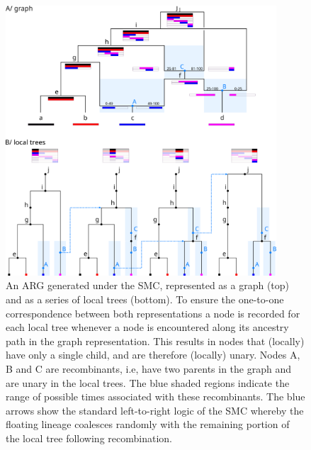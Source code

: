 \documentclass{article}
\begin{document}
\begin{figure}
\centering
\includegraphics[width=0.9\textwidth]{figures/smc_custom_2rows_area_full_hap.png}
\caption{An ARG generated under the SMC, represented as a graph (top) and as a
series of local trees (bottom). To ensure the one-to-one correspondence
between both representations a node is recorded for each local tree whenever
a node is encountered along its ancestry path in the graph representation.
This results in nodes that (locally) have only a single child, and are therefore
(locally) unary. 
Nodes A, B and C are recombinants, i.e, have two parents in the graph
and are unary in the local trees. The blue shaded regions indicate
the range of possible times associated with these recombinants.
The blue arrows show the
standard left-to-right logic of the SMC whereby
the floating lineage coalesces randomly
    with the remaining portion of the local tree following recombination.
}
\label{fig:smc-unary}
\end{figure}
\end{document}

